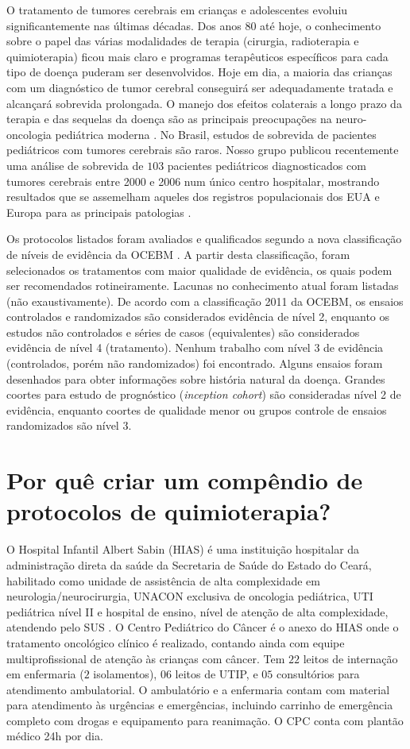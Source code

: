 \documentclass[11pt,a4paper,oldfontcommands]{memoir}
\begin{document}
O tratamento de tumores cerebrais em crianças e adolescentes evoluiu significantemente nas últimas décadas. Dos anos 80 até hoje, o conhecimento sobre o papel das várias modalidades de terapia (cirurgia, radioterapia e quimioterapia) ficou mais claro e programas terapêuticos específicos para cada tipo de doença puderam ser desenvolvidos. Hoje em dia, a maioria das crianças com um diagnóstico de tumor cerebral conseguirá ser adequadamente tratada e alcançará sobrevida prolongada. O manejo dos efeitos colaterais a longo prazo da terapia e das sequelas da doença são as principais preocupações na neuro-oncologia pediátrica moderna \cite{merchant}. No Brasil, estudos de sobrevida de pacientes pediátricos com tumores cerebrais são raros. Nosso grupo publicou recentemente uma análise de sobrevida de \(103\) pacientes pediátricos diagnosticados com tumores cerebrais entre 2000 e 2006 num único centro hospitalar, mostrando resultados que se assemelham aqueles dos registros populacionais dos EUA e Europa para as principais patologias \cite{araujo}.

Os protocolos listados foram avaliados e qualificados segundo a nova classificação de níveis de evidência da OCEBM \cite{ocebm}. A partir desta classificação, foram selecionados os tratamentos com maior qualidade de evidência, os quais podem ser recomendados rotineiramente. Lacunas no conhecimento atual foram listadas (não exaustivamente). De acordo com a classificação 2011 da OCEBM, os ensaios controlados e randomizados são considerados evidência de nível 2, enquanto os estudos não controlados e séries de casos (equivalentes) são considerados evidência de nível 4 (tratamento). Nenhum trabalho com nível 3 de evidência (controlados, porém não randomizados) foi encontrado. Alguns ensaios foram desenhados para obter informações sobre história natural da doença. Grandes coortes para estudo de prognóstico (\textit{inception cohort}) são consideradas nível 2 de evidência, enquanto coortes de qualidade menor ou grupos controle de ensaios randomizados são nível 3.

\section{Por quê criar um compêndio de protocolos de quimioterapia?}
O Hospital Infantil Albert Sabin (HIAS) é uma instituição hospitalar da administração direta da saúde da Secretaria de Saúde do Estado do Ceará, habilitado como unidade de assistência de alta complexidade em neurologia/neurocirurgia, UNACON exclusiva de oncologia pediátrica, UTI pediátrica nível II e hospital de ensino, nível de atenção de alta complexidade, atendendo pelo SUS \cite{cnes}. O Centro Pediátrico do Câncer é o anexo do HIAS onde o tratamento oncológico clínico é realizado, contando ainda com equipe multiprofissional de atenção às crianças com câncer. Tem \(22\) leitos de internação em enfermaria (\(2\) isolamentos), \(06\) leitos de UTIP, e \(05\) consultórios para atendimento ambulatorial. O ambulatório e a enfermaria contam com material para atendimento às urgências e emergências, incluindo carrinho de emergência completo com drogas e equipamento para reanimação. O CPC conta com plantão médico 24h por dia.
\end{document}
